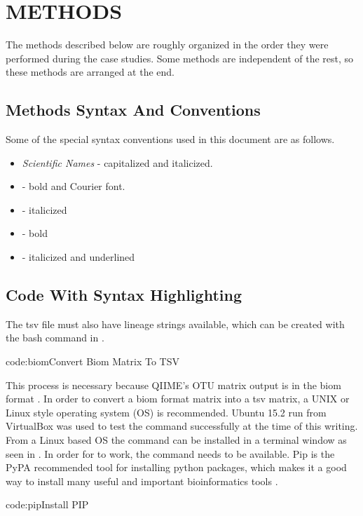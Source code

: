 
\chapter{METHODS}\label{ch:methods}

The methods described below are roughly organized in the order they were performed during the case studies. 
Some methods are independent of the rest, so these methods are arranged at the end.

\section{Methods Syntax And Conventions}

Some of the special syntax conventions used in this document are as follows.

\begin{itemize}
\item \textit{Scientific Names} - capitalized and italicized.
\item {} - bold and Courier font.
\item {} - italicized
\item {} - bold
\item {} - italicized and underlined
\end{itemize}

\clearpage %

\section{Code With Syntax Highlighting} \label{sec:code}
  
The tsv file must also have lineage strings available, which can be created with the bash command in .

          {code:biom}{Convert Biom Matrix To TSV}

This process is necessary because QIIME's OTU matrix output is in the biom format \cite{biom}.
In order to convert a biom format matrix into a tsv matrix, a UNIX or Linux style operating system (OS) is recommended. 
Ubuntu 15.2 run from VirtualBox \cite{virtualbox} was used to test the  command successfully at the time of this writing. 
From a Linux based OS the  command can be installed in a terminal window as seen in . 
In order for  to work, the  command needs to be available. 
Pip is the PyPA recommended tool for installing python packages, which makes it a good way to install many useful and important bioinformatics tools \cite{pip}.

          {code:pip}{Install PIP}

